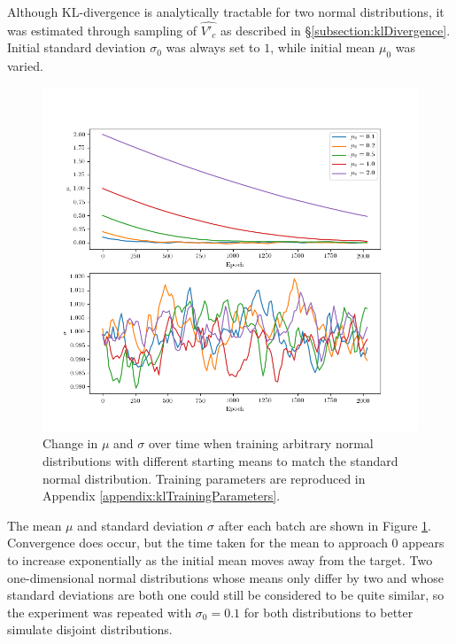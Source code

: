 \documentclass[../../main.tex]{subfiles}
\begin{document}
Although KL-divergence is analytically tractable for two normal distributions, it was estimated through sampling of $\hat{V'_c}$ as described in \S\ref{subsection:klDivergence}.
Initial standard deviation $\sigma_0$ was always set to $1$, while initial mean $\mu_0$ was varied.
\begin{figure}[H]
    \begin{center}
    \includegraphics[width=\textwidth]{broadKLDivergence}
    \caption[$\mu$ and $\sigma$ minimising $D_\text{KL}$]{
        Change in $\mu$ and $\sigma$ over time when training arbitrary normal distributions with different starting means to match the standard normal distribution.
        Training parameters are reproduced in Appendix \ref{appendix:klTrainingParameters}.
    }
    \label{fig:broadKLDivergence}
    \end{center}
\end{figure}
The mean $\mu$ and standard deviation $\sigma$ after each batch are shown in Figure \ref{fig:broadKLDivergence}.
Convergence does occur, but the time taken for the mean to approach $0$ appears to increase exponentially as the initial mean moves away from the target.
Two one-dimensional normal distributions whose means only differ by two and whose standard deviations are both one could still be considered to be quite similar, so the experiment was repeated with $\sigma_0=0.1$ for both distributions to better simulate disjoint distributions.
\end{document}

